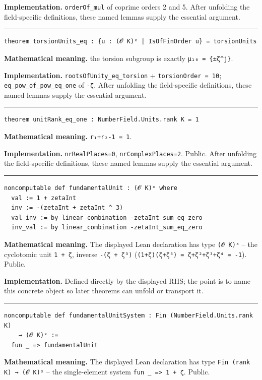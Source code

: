 \documentclass[UTF8,a4paper,11pt,fontset=fandol]{ctexart}
\theoremstyle{definition}
\newcommand{\statementsep}{\par\medskip\hrule\medskip}
\begin{document}
\noindent\textbf{Implementation.} \texttt{orderOf\_\allowbreak{}mul} of coprime orders 2 and 5. After unfolding the field-specific definitions, these named lemmas supply the essential argument.\par
\statementsep
\begin{verbatim}
theorem torsionUnits_eq : {u : (𝓞 K)ˣ | IsOfFinOrder u} = torsionUnits
\end{verbatim}
\noindent\textbf{Mathematical meaning.} the torsion subgroup is exactly \texttt{μ₁₀ = \{±ζ\textasciicircum{}j\}}.\par
\noindent\textbf{Implementation.} \texttt{rootsOfUnity\_\allowbreak{}eq\_\allowbreak{}torsion} + \texttt{torsionOrder = 10}; \texttt{eq\_\allowbreak{}pow\_\allowbreak{}of\_\allowbreak{}pow\_\allowbreak{}eq\_\allowbreak{}one} of \texttt{-ζ}. After unfolding the field-specific definitions, these named lemmas supply the essential argument.\par
\statementsep
\begin{verbatim}
theorem unitRank_eq_one : NumberField.Units.rank K = 1
\end{verbatim}
\noindent\textbf{Mathematical meaning.} \texttt{r₁+r₂-1 = 1}.\par
\noindent\textbf{Implementation.} \texttt{nrRealPlaces=0}, \texttt{nrComplexPlaces=2}. Public. After unfolding the field-specific definitions, these named lemmas supply the essential argument.\par
\statementsep
\begin{verbatim}
noncomputable def fundamentalUnit : (𝓞 K)ˣ where
  val := 1 + zetaInt
  inv := -(zetaInt + zetaInt ^ 3)
  val_inv := by linear_combination -zetaInt_sum_eq_zero
  inv_val := by linear_combination -zetaInt_sum_eq_zero
\end{verbatim}
\noindent\textbf{Mathematical meaning.} The displayed Lean declaration has type \texttt{(𝓞 K)ˣ} -- the cyclotomic unit \texttt{1 + ζ}, inverse \texttt{-(ζ + ζ³)} (\texttt{(1+ζ)(ζ+ζ³) = ζ+ζ²+ζ³+ζ⁴ = -1}). Public.\par
\noindent\textbf{Implementation.} Defined directly by the displayed RHS; the point is to name this concrete object so later theorems can unfold or transport it.\par
\statementsep
\begin{verbatim}
noncomputable def fundamentalUnitSystem : Fin (NumberField.Units.rank K)
    → (𝓞 K)ˣ :=
  fun _ => fundamentalUnit
\end{verbatim}
\noindent\textbf{Mathematical meaning.} The displayed Lean declaration has type \texttt{Fin (rank K) → (𝓞 K)ˣ} -- the single-element system \texttt{fun \_\allowbreak{} => 1 + ζ}. Public.\par
\end{document}
